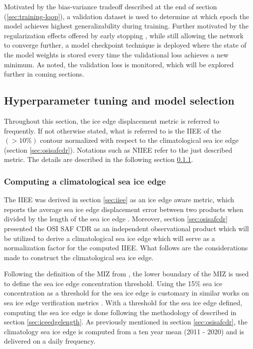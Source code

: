 \documentclass[../main/thesis]{subfiles}
\begin{document}
Motivated by the bias-variance tradeoff described at the end of section (\ref{sec:training-loop}), a validation dataset is used to determine at which epoch the model achieves highest generalizability during training. Further motivated by the regularization effects offered by early stopping \citep{Graves2013}, while still allowing the network to converge further, a model checkpoint technique is deployed where the state of the model weights is stored every time the validational loss achieves a new minimum. As noted, the validation loss is monitored, which will be explored further in coming sections.


\subsection{Hyperparameter tuning and model selection}
\label{sec:model_development_results}
Throughout this section, the ice edge displacement metric is referred to frequently. If not otherwise stated, what is referred to is the IIEE of the $(> 10\%)$ contour normalized with respect to the climatological sea ice edge (section \ref{sec:osisafcdr}). Notations such as NIIEE refer to the just described metric. The details are described in the following section \ref{sec:clim_iceedge_compute}.

\subsubsection{Computing a climatological sea ice edge}
\label{sec:clim_iceedge_compute}
The IIEE \citep{Goessling2016} was derived in section \ref{sec:iiee} as an ice edge aware metric, which reports the average sea ice edge displacement error between two products when divided by the length of the sea ice edge \citep{Melsom2019}. Moreover, section \ref{sec:osisafcdr} presented the OSI SAF CDR as an independent observational product which will be utilized to derive a climatological sea ice edge which will serve as a normalization factor for the computed IIEE. What follows are the considerations made to construct the climatological sea ice edge.

Following the definition of the MIZ from \citet{Strong2012}, the lower boundary of the MIZ is used to define the sea ice edge concentration threshold. Using the 15\% sea ice concentration as a threshold for the sea ice edge is customary in similar works on sea ice edge verification metrics \citep{Dukhovskoy2015,Goessling2016,Goessling2018,Melsom2019}. With a threshold for the sea ice edge defined, computing the sea ice edge is done following the methodology of \citet{Melsom2019} described in section \ref{sec:iceedgelength}. As previously mentioned in section \ref{sec:osisafcdr}, the climatology sea ice edge is computed from a ten year mean (2011 - 2020) and is delivered on a daily frequency.
\end{document}
